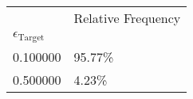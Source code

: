 \begin{tabular}{ll}
 & Relative Frequency \\
$\epsilon_{{\text{{Target}}}}$ &  \\
0.100000 & 95.77\% \\
\cline{1-2}
0.500000 & 4.23\% \\
\cline{1-2}
\end{tabular}

